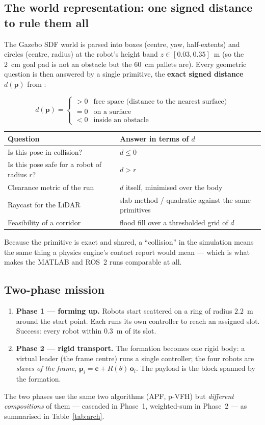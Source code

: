 \subsection{The world representation: one signed distance to rule them all}

The Gazebo SDF world is parsed into boxes (centre, yaw, half-extents) and
circles (centre, radius) at the robot's height band
$z \in [0.03, 0.35]$~m (so the 2~cm goal pad is not an obstacle but the 60~cm
pallets are). Every geometric question is then answered by a single primitive,
the \textbf{exact signed distance} $d(\mathbf{p})$ from :

\[
d(\mathbf{p}) =
\begin{cases}
>0 & \text{free space (distance to the nearest surface)}\\
=0 & \text{on a surface}\\
<0 & \text{inside an obstacle}
\end{cases}
\]

\begin{center}
\begin{tabular}{@{}ll@{}}
\toprule
\textbf{Question} & \textbf{Answer in terms of $d$}\\
\midrule
Is this pose in collision? & $d \le 0$\\
Is this pose safe for a robot of radius $r$? & $d > r$\\
Clearance metric of the run & $d$ itself, minimised over the body\\
Raycast for the LiDAR & slab method / quadratic against the same primitives\\
Feasibility of a corridor & flood fill over a thresholded grid of $d$\\
\bottomrule
\end{tabular}
\end{center}

Because the primitive is exact and shared, a ``collision'' in the simulation
means the same thing a physics engine's contact report would mean --- which is
what makes the MATLAB and ROS~2 runs comparable at all.

\subsection{Two-phase mission}

\begin{enumerate}[leftmargin=1.6em]
\item \textbf{Phase 1 --- forming up.} Robots start scattered on a ring of
radius $2.2$~m around the start point. Each runs its own controller to reach
an assigned slot. Success: every robot within $0.3$~m of its slot.
\item \textbf{Phase 2 --- rigid transport.} The formation becomes one rigid
body: a virtual leader (the frame centre) runs a single controller; the four
robots are \emph{slaves of the frame}, $\mathbf{p}_i = \mathbf{c} + R(\theta)\,
\mathbf{o}_i$. The payload is the block spanned by the formation.
\end{enumerate}

The two phases use the same two algorithms (APF, p-VFH) but \emph{different
compositions} of them --- cascaded in Phase~1, weighted-sum in Phase~2 --- as
summarised in Table~\ref{tab:arch}.

